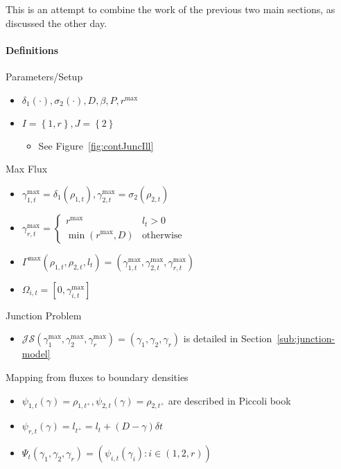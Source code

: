 This is an attempt to combine the work of the previous two main sections, as discussed the other day.
\paragraph{Definitions}

Parameters/Setup
\begin{itemize}
\item $\delta_{1}\left(\cdot\right),\sigma_{2}\left(\cdot\right),D,\beta,P,r^{\max}$
\item $I=\left\{ 1,r\right\} ,J=\left\{ 2\right\} $
\begin{itemize}
\item See Figure~\ref{fig:contJuncIll}
\end{itemize}
\end{itemize}
Max Flux
\begin{itemize}
\item $\gamma_{1,t}^{\max}=\delta_{1}\left(\rho_{1,t}\right),\gamma_{2,t}^{\max}=\sigma_{2}\left(\rho_{2,t}\right)$
\item $\gamma_{r,t}^{\max}=\begin{cases}
r^{\max} & l_{t}>0\\
\min\left(r^{\max},D\right) & \text{otherwise}
\end{cases}$
\item $\Gamma^{\max}\left(\rho_{1,t},\rho_{2,t},l_{t}\right)=$$\left(\gamma_{1,t}^{\max},\gamma_{2,t}^{\max},\gamma_{r,t}^{\max}\right)$
\item $\Omega_{i,t}=\left[0,\gamma_{i,t}^{\max}\right]$
\end{itemize}
Junction Problem
\begin{itemize}
\item $\mathcal{JS}\left(\gamma_{1}^{\max},\gamma_{2}^{\max},\gamma_{r}^{\max}\right)=\left(\gamma_{1},\gamma_{2},\gamma_{r}\right)$
is detailed in Section~\ref{sub:junction-model}
\end{itemize}
Mapping from fluxes to boundary densities
\begin{itemize}
\item $\psi_{1,t}\left(\gamma\right)=\rho_{1,t^{+}},\psi_{2,t}\left(\gamma\right)=\rho_{2,t^{+}}$
are described in Piccoli book
\item $\psi_{r,t}\left(\gamma\right)=l_{t^{+}}=l_t + \left(D-\gamma\right)\delta t$
\item $\Psi_{t}\left(\gamma_{1},\gamma_{2},\gamma_{r}\right)=\left(\psi_{i,t}\left(\gamma_{i}\right):i\in\left(1,2,r\right)\right)$
\end{itemize}
